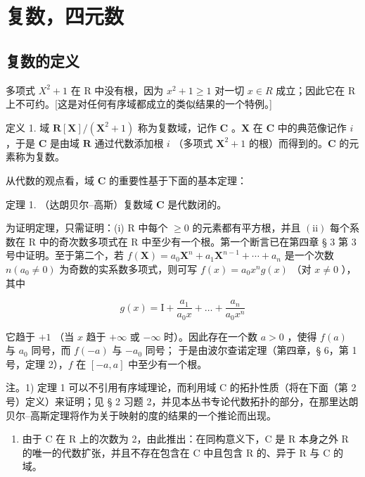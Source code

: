 \section{复数，四元数}

\subsection{复数的定义}

多项式 \(X^{2} + 1\) 在 R 中没有根，因为 \(x^{2} + 1 \geqslant 1\) 对一切 \(x \in R\) 成立；因此它在 R 上不可约。{[}这是对任何有序域都成立的类似结果的一个特例。{]}

定义 1. 域 \(\mathbf{R}[\mathbf{X}] / (\mathbf{X}^2 + 1)\) 称为复数域，记作 \(\mathbf{C}\) 。\(\mathbf{X}\) 在 \(\mathbf{C}\) 中的典范像记作 \(i\) ，于是 \(\mathbf{C}\) 是由域 \(\mathbf{R}\) 通过代数添加根 \(i\) （多项式 \(\mathbf{X}^2 + 1\) 的根）而得到的。\(\mathbf{C}\) 的元素称为复数。

从代数的观点看，域 \(\mathbf{C}\) 的重要性基于下面的基本定理：

定理 1. （达朗贝尔–高斯）复数域 \(\mathbf{C}\) 是代数闭的。

为证明定理，只需证明：(i) R 中每个 \(\geqslant0\) 的元素都有平方根，并且 \((\mathrm{ii})\) 每个系数在 R 中的奇次数多项式在 R 中至少有一个根。第一个断言已在第四章 § 3 第 3 号中证明。至于第二个，若 \(f(\mathbf{X}) = a_{0}\mathbf{X}^{n} + a_{1}\mathbf{X}^{n-1} + \cdots + a_{n}\) 是一个次数 \(n(a_{0} \neq 0)\) 为奇数的实系数多项式，则可写 \(f(x) = a_{0}x^{n}g(x)\) （对 \(x \neq 0\) ），其中

\[
g (x) = \mathrm{I} + \frac {a _ {1}}{a _ {0} x} + \dots + \frac {a _ {n}}{a _ {0} x ^ {n}}
\]

它趋于 \(+1\) （当 \(x\) 趋于 \(+\infty\) 或 \(-\infty\) 时）。因此存在一个数 \(a > 0\) ，使得 \(f(a)\) 与 \(a_0\) 同号，而 \(f(-a)\) 与 \(-a_0\) 同号；
于是由波尔查诺定理（第四章，§ 6，第 1 号，定理 2），\(f\) 在 \([-a, a]\) 中至少有一个根。

注。1) 定理 1 可以不引用有序域理论，而利用域 C 的拓扑性质（将在下面（第 2 号）定义）来证明；见 § 2 习题 2，并见本丛书专论代数拓扑的部分，在那里达朗贝尔–高斯定理将作为关于映射的度的结果的一个推论而出现。

\begin{enumerate}
\def\labelenumi{\arabic{enumi})}
\setcounter{enumi}{1}
\tightlist
\item
  由于 C 在 R 上的次数为 2，由此推出：在同构意义下，C 是 R 本身之外 R 的唯一的代数扩张，并且不存在包含在 C 中且包含 R 的、异于 R 与 C 的域。
\end{enumerate}

